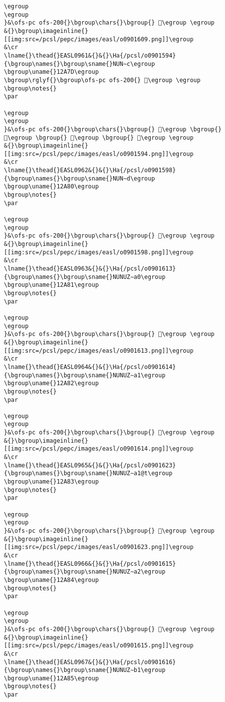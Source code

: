 \begin{verbatim}
\egroup
\egroup
}&\ofs-pc ofs-200{}\bgroup\chars{}\bgroup{} 𒩻\egroup \egroup
&{}\bgroup\imageinline{}[[img:src=/pcsl/pepc/images/easl/o0901609.png]]\egroup
&\cr
\lname{}\thead{}EASL0961&{}&{}\Ha{/pcsl/o0901594}{\bgroup\names{}\bgroup\sname{}NUN∼c\egroup
\bgroup\uname{}12A7D\egroup
\bgroup\rglyf{}\bgroup\ofs-pc ofs-200{} 𒩽\egroup \egroup
\bgroup\notes{}
\par 

\egroup
\egroup
}&\ofs-pc ofs-200{}\bgroup\chars{}\bgroup{} 𒩼\egroup \bgroup{} 𒩽\egroup \bgroup{} 𒩾\egroup \bgroup{} 𒩿\egroup \egroup
&{}\bgroup\imageinline{}[[img:src=/pcsl/pepc/images/easl/o0901594.png]]\egroup
&\cr
\lname{}\thead{}EASL0962&{}&{}\Ha{/pcsl/o0901598}{\bgroup\names{}\bgroup\sname{}NUN∼d\egroup
\bgroup\uname{}12A80\egroup
\bgroup\notes{}
\par 

\egroup
\egroup
}&\ofs-pc ofs-200{}\bgroup\chars{}\bgroup{} 𒪀\egroup \egroup
&{}\bgroup\imageinline{}[[img:src=/pcsl/pepc/images/easl/o0901598.png]]\egroup
&\cr
\lname{}\thead{}EASL0963&{}&{}\Ha{/pcsl/o0901613}{\bgroup\names{}\bgroup\sname{}NUNUZ∼a0\egroup
\bgroup\uname{}12A81\egroup
\bgroup\notes{}
\par 

\egroup
\egroup
}&\ofs-pc ofs-200{}\bgroup\chars{}\bgroup{} 𒪁\egroup \egroup
&{}\bgroup\imageinline{}[[img:src=/pcsl/pepc/images/easl/o0901613.png]]\egroup
&\cr
\lname{}\thead{}EASL0964&{}&{}\Ha{/pcsl/o0901614}{\bgroup\names{}\bgroup\sname{}NUNUZ∼a1\egroup
\bgroup\uname{}12A82\egroup
\bgroup\notes{}
\par 

\egroup
\egroup
}&\ofs-pc ofs-200{}\bgroup\chars{}\bgroup{} 𒪂\egroup \egroup
&{}\bgroup\imageinline{}[[img:src=/pcsl/pepc/images/easl/o0901614.png]]\egroup
&\cr
\lname{}\thead{}EASL0965&{}&{}\Ha{/pcsl/o0901623}{\bgroup\names{}\bgroup\sname{}NUNUZ∼a1@t\egroup
\bgroup\uname{}12A83\egroup
\bgroup\notes{}
\par 

\egroup
\egroup
}&\ofs-pc ofs-200{}\bgroup\chars{}\bgroup{} 𒪃\egroup \egroup
&{}\bgroup\imageinline{}[[img:src=/pcsl/pepc/images/easl/o0901623.png]]\egroup
&\cr
\lname{}\thead{}EASL0966&{}&{}\Ha{/pcsl/o0901615}{\bgroup\names{}\bgroup\sname{}NUNUZ∼a2\egroup
\bgroup\uname{}12A84\egroup
\bgroup\notes{}
\par 

\egroup
\egroup
}&\ofs-pc ofs-200{}\bgroup\chars{}\bgroup{} 𒪄\egroup \egroup
&{}\bgroup\imageinline{}[[img:src=/pcsl/pepc/images/easl/o0901615.png]]\egroup
&\cr
\lname{}\thead{}EASL0967&{}&{}\Ha{/pcsl/o0901616}{\bgroup\names{}\bgroup\sname{}NUNUZ∼b1\egroup
\bgroup\uname{}12A85\egroup
\bgroup\notes{}
\par 


\end{verbatim}
